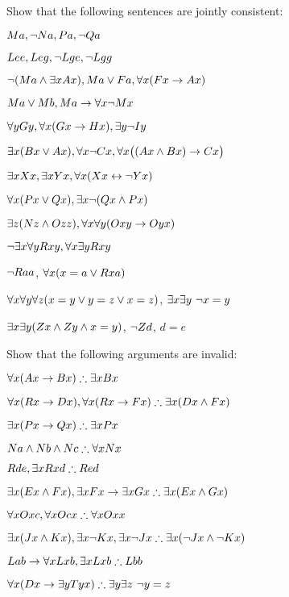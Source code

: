 \problempart
Show that the following sentences are jointly consistent:
\begin{earg}
\item $Ma, \neg Na, Pa, \neg Qa$
\item $Lee, Leg, \neg Lge, \neg Lgg$
\item $\neg (Ma \wedge \exists x Ax), Ma \vee Fa, \forall x(Fx \rightarrow Ax)$
\item $Ma \vee Mb, Ma \rightarrow \forall x \neg Mx$
\item $\forall y Gy, \forall x (Gx \rightarrow Hx), \exists y \neg Iy$
\item $\exists x(Bx \vee Ax), \forall x \neg Cx, \forall x\bigl( (Ax \wedge Bx) \rightarrow Cx\bigr)$
\item $\exists x Xx, \exists x Yx, \forall x(Xx \leftrightarrow \neg Yx)$
\item $\forall x(Px \vee Qx), \exists x\neg(Qx \wedge Px)$
\item $\exists z(Nz \wedge Ozz), \forall x\forall y(Oxy \rightarrow Oyx)$
\item $\neg \exists x \forall y Rxy, \forall x \exists y Rxy$
\item $\neg Raa$, $\forall x (x=a \vee Rxa)$
\item $\forall x\forall y\forall z(x=y \vee y=z \vee x=z)$, $\exists x\exists y\ \neg x= y$
\item $\exists x\exists y(Zx \wedge Zy \wedge x=y)$, $\neg Zd$, $d=e$
\end{earg}

\problempart
Show that the following arguments are invalid:
\begin{earg}
\item $\forall x(Ax \rightarrow Bx) \mathrel{\therefore} \exists x Bx$
\item $\forall x(Rx \rightarrow Dx), \forall x(Rx \rightarrow Fx) \mathrel{\therefore} \exists x(Dx \wedge Fx)$
\item $\exists x(Px\rightarrow Qx) \mathrel{\therefore} \exists x Px$
\item $Na \wedge Nb \wedge Nc \mathrel{\therefore} \forall x Nx$
\item $Rde, \exists x Rxd \mathrel{\therefore} Red$
\item $\exists x(Ex \wedge Fx), \exists x Fx \rightarrow \exists x Gx \mathrel{\therefore} \exists x(Ex \wedge Gx)$
\item $\forall x Oxc, \forall x Ocx \mathrel{\therefore} \forall x Oxx$
\item $\exists x(Jx \wedge Kx), \exists x \neg Kx, \exists x \neg Jx \mathrel{\therefore} \exists x(\neg Jx \wedge \neg Kx)$
\item $Lab \rightarrow \forall x Lxb, \exists x Lxb \mathrel{\therefore} Lbb$
\item $\forall x(Dx \rightarrow \exists y Tyx) \mathrel{\therefore} \exists y \exists z\ \neg y= z$
\end{earg}

